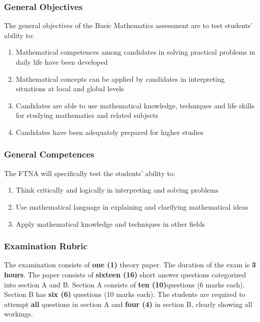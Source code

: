 \subsubsection{General Objectives}
\noindent The general objectives of the Basic Mathematics assessment are to test students' ability to:
\begin{enumerate}[topsep=1ex,itemsep=0ex,partopsep=1ex,parsep=1ex]
	\item Mathematical competences among candidates in solving practical problems in daily life have been developed
	\item Mathematical concepts can be applied by candidates in interpreting situations at local and global levels
	\item Candidates are able to use mathematical knowledge, techniques and life skills for studying mathematics and related subjects
	\item Candidates have been adequately prepared for higher studies
\end{enumerate}

\subsubsection{General Competences}
\noindent The FTNA will specifically test the students' ability to:
\begin{enumerate}[topsep=1ex,itemsep=0ex,partopsep=1ex,parsep=1ex]
	\item Think critically and logically in interpreting and solving problems
	\item Use mathematical language in explaining and clarifying mathematical ideas
	\item Apply mathematical knowledge and techniques in other fields
\end{enumerate}

\subsubsection{Examination Rubric}
\noindent The examination consists of \textbf{one (1)} theory paper. The duration of the exam is \textbf{3 hours}. The paper consists of \textbf{sixteen (16)} short answer questions categorized into section A and B. Section A consists of \textbf{ten (10)}questions (6 marks each). Section B has \textbf{six (6)} questions (10 marks each). The students are required to attempt \textbf{all} questions in section A and \textbf{four (4)} in section B, clearly showing all workings. \\

